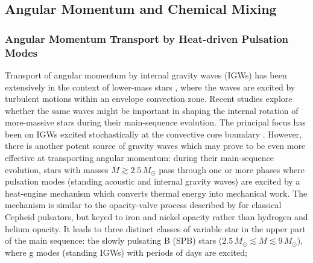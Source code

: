 
\subsection{Angular Momentum and Chemical Mixing}

\subsubsection{Angular Momentum Transport by Heat-driven Pulsation Modes}

Transport of angular momentum by internal gravity waves (IGWs) has been extensively in the context of lower-mass stars  \citep[e.g.,][]{Schatzman:1993,Kumar:1997,Zahn:1997,Talon:2002,Talon:2005,Rogers:2008}, where the waves are excited by turbulent motions within an envelope convection zone. Recent studies explore whether the same waves might be important in shaping the internal rotation of more-massive stars during their main-sequence evolution. The principal focus has been on IGWs excited stochastically at the convective core boundary \citep[e.g.][]{Rogers:2013,Lee:2014,Rogers:2015}. However, there is another potent source of gravity waves which may prove to be even more effective at transporting angular momentum: during their main-sequence evolution, stars with masses $M \gtrsim 2.5\,M_{\odot}$ pass through one or more phases where pulsation modes (standing acoustic and internal gravity waves) are excited by a heat-engine mechanism which converts thermal energy into mechanical work. The mechanism is similar to the opacity-valve process described by \citet{Eddington:1926} for classical Cepheid pulsators, but keyed to iron and nickel opacity rather than hydrogen and helium opacity. It leads to three distinct classes of variable star in the upper part of the main sequence: the slowly pulsating B (SPB) stars ($2.5\,M_{\odot} \lesssim M \lesssim 9\,M_{\odot}$), where g modes (standing IGWs) with periods of days are excited; 


